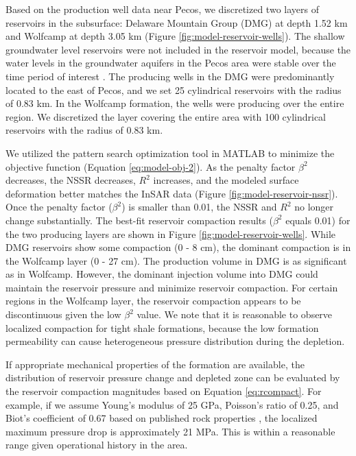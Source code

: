 \documentclass{utexasthesis}
\begin{document}
Based on the production well data near Pecos, we discretized two layers of reservoirs in the subsurface: Delaware Mountain Group (DMG) at depth 1.52 km and Wolfcamp at depth 3.05 km (Figure \ref{fig:model-reservoir-wells}). The shallow groundwater level reservoirs were not included in the reservoir model, because the water levels in the groundwater aquifers in the Pecos area were stable over the time period of interest \cite{deng2020surface}. The producing wells in the DMG were predominantly located to the east of Pecos, and we set 25 cylindrical reservoirs with the radius of 0.83 km. In the Wolfcamp formation, the wells were producing over the entire region. We discretized the layer covering the entire area with 100 cylindrical reservoirs with the radius of 0.83 km.  

We utilized the pattern search optimization tool in MATLAB to minimize the objective function (Equation \eqref{eq:model-obj-2}). As the penalty factor $\beta^2$ decreases, the NSSR decreases, $ R^2 $ increases, and the modeled surface deformation better matches the InSAR data (Figure \ref{fig:model-reservoir-nssr}). Once the penalty factor ($ \beta^2 $) is smaller than 0.01, the NSSR and $ R^2 $ no longer change substantially. The best-fit reservoir compaction results ($ \beta^2 $ equals 0.01) for the two producing layers are shown in Figure \ref{fig:model-reservoir-wells}. While DMG reservoirs show some compaction (0 - 8 cm), the dominant compaction is in the Wolfcamp layer (0 - 27 cm). The production volume in DMG is as significant as in Wolfcamp. However, the dominant injection volume into DMG could maintain the reservoir pressure and minimize reservoir compaction. For certain regions in the Wolfcamp layer, the reservoir compaction appears to be discontinuous given the low $ \beta^2 $ value. We note that it is reasonable to observe localized compaction for tight shale formations, because the low formation permeability can cause heterogeneous pressure distribution during the depletion.

If appropriate mechanical properties of the formation are available, the distribution of reservoir pressure change and depleted zone can be evaluated by the reservoir compaction magnitudes based on Equation \eqref{eq:rcompact}. For example, if we assume Young’s modulus of 25 GPa, Poisson’s ratio of 0.25, and Biot’s coefficient of 0.67 based on published rock properties \cite{Shukla2013, Xu2015analysis}, the localized maximum pressure drop is approximately 21 MPa. This is within a reasonable range given operational history in the area.
\end{document}
